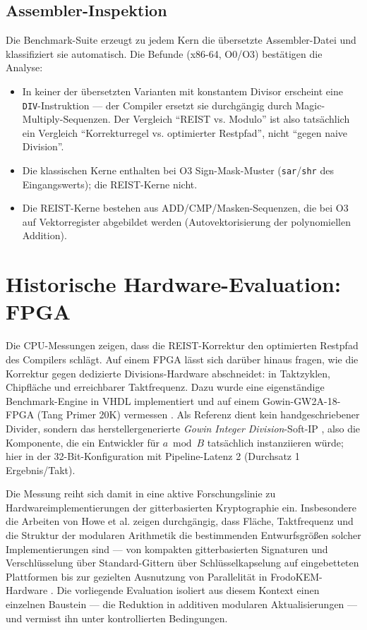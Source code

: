 \documentclass[11pt,a4paper]{scrartcl}
\theoremstyle{definition}
\theoremstyle{plain}
\theoremstyle{remark}
\begin{document}
\subsection{Assembler-Inspektion}
\label{sec:asm}

Die Benchmark-Suite erzeugt zu jedem Kern die übersetzte Assembler-Datei und klassifiziert sie automatisch. Die Befunde (x86-64, O0/O3) bestätigen die Analyse:

\begin{itemize}
\item In keiner der übersetzten Varianten mit konstantem Divisor erscheint eine \texttt{DIV}-Instruktion --- der Compiler ersetzt sie durchgängig durch Magic-Multiply-Sequenzen. Der Vergleich \enquote{REIST vs. Modulo} ist also tatsächlich ein Vergleich \enquote{Korrekturregel vs. optimierter Restpfad}, nicht \enquote{gegen naive Division}.
\item Die klassischen Kerne enthalten bei O3 Sign-Mask-Muster (\texttt{sar}/\texttt{shr} des Eingangswerts); die REIST-Kerne nicht.
\item Die REIST-Kerne bestehen aus ADD/CMP/Masken-Sequenzen, die bei O3 auf Vektorregister abgebildet werden (Autovektorisierung der polynomiellen Addition).
\end{itemize}

\section{Historische Hardware-Evaluation: FPGA}
\label{sec:fpga}

Die CPU-Messungen zeigen, dass die REIST-Korrektur den optimierten Restpfad des Compilers schlägt. Auf einem FPGA lässt sich darüber hinaus fragen, wie die Korrektur gegen dedizierte Divisions-Hardware abschneidet: in Taktzyklen, Chipfläche und erreichbarer Taktfrequenz. Dazu wurde eine eigenständige Benchmark-Engine in VHDL implementiert und auf einem Gowin-GW2A-18-FPGA (Tang Primer 20K) vermessen \cite{fpgarepo}. Als Referenz dient kein handgeschriebener Divider, sondern das herstellergenerierte \emph{Gowin Integer Division}-Soft-IP \cite{gowin}, also die Komponente, die ein Entwickler für $a \bmod B$ tatsächlich instanziieren würde; hier in der 32-Bit-Konfiguration mit Pipeline-Latenz 2 (Durchsatz 1 Ergebnis/Takt).

Die Messung reiht sich damit in eine aktive Forschungslinie zu Hardwareimplementierungen der gitterbasierten Kryptographie ein. Insbesondere die Arbeiten von Howe et al. zeigen durchgängig, dass Fläche, Taktfrequenz und die Struktur der modularen Arithmetik die bestimmenden Entwurfsgrößen solcher Implementierungen sind --- von kompakten gitterbasierten Signaturen \cite{howe2015} und Verschlüsselung über Standard-Gittern \cite{howe2016dac} über Schlüsselkapselung auf eingebetteten Plattformen \cite{howe2018tches} bis zur gezielten Ausnutzung von Parallelität in FrodoKEM-Hardware \cite{howe2021frodo}. Die vorliegende Evaluation isoliert aus diesem Kontext einen einzelnen Baustein --- die Reduktion in additiven modularen Aktualisierungen --- und vermisst ihn unter kontrollierten Bedingungen.
\end{document}
